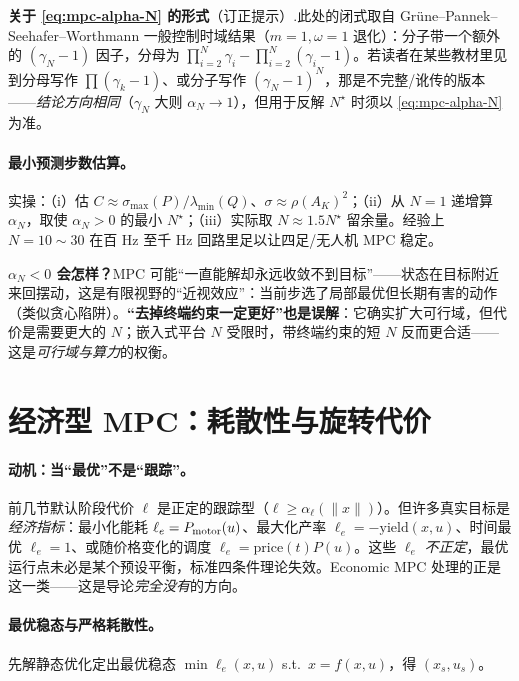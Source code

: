 \begin{note}
\textbf{关于 \cref{eq:mpc-alpha-N} 的形式}（订正提示）.\;此处的闭式取自 Grüne--Pannek--Seehafer--Worthmann 一般控制时域结果（$m=1,\omega=1$ 退化）：分子带一个额外的 $(\gamma_N-1)$ 因子，分母为 $\prod_{i=2}^N\gamma_i-\prod_{i=2}^N(\gamma_i-1)$。若读者在某些教材里见到分母写作 $\prod(\gamma_k-1)$、或分子写作 $(\gamma_N-1)^N$，那是不完整/讹传的版本——\emph{结论方向相同}（$\gamma_N$ 大则 $\alpha_N\to1$），但用于反解 $N^\star$ 时须以 \cref{eq:mpc-alpha-N} 为准。
\end{note}

\paragraph{最小预测步数估算。}
实操：（i）估 $C\approx\sigma_{\max}(P)/\lambda_{\min}(Q)$、$\sigma\approx\rho(A_K)^2$；（ii）从 $N=1$ 递增算 $\alpha_N$，取使 $\alpha_N>0$ 的最小 $N^\star$；（iii）实际取 $N\approx1.5N^\star$ 留余量。经验上 $N=10\sim30$ 在百 Hz 至千 Hz 回路里足以让四足/无人机 MPC 稳定。

\begin{remark}
\textbf{$\alpha_N<0$ 会怎样？}\;MPC 可能“一直能解却永远收敛不到目标”——状态在目标附近来回摆动，这是有限视野的“近视效应”：当前步选了局部最优但长期有害的动作（类似贪心陷阱）。\textbf{“去掉终端约束一定更好”也是误解}：它确实扩大可行域，但代价是需要更大的 $N$；嵌入式平台 $N$ 受限时，带终端约束的短 $N$ 反而更合适——这是\emph{可行域与算力}的权衡。
\end{remark}

\section{经济型 MPC：耗散性与旋转代价}
\label{sec:mpc-economic}

\paragraph{动机：当“最优”不是“跟踪”。}
前几节默认阶段代价 $\ell$ 是正定的跟踪型（$\ell\ge\alpha_\ell(\|x\|)$）。但许多真实目标是\emph{经济指标}：最小化能耗 $\ell_e=P_{\rm motor}(u)$、最大化产率 $\ell_e=-\mathrm{yield}(x,u)$、时间最优 $\ell_e=1$、或随价格变化的调度 $\ell_e=\mathrm{price}(t)P(u)$。这些 $\ell_e$ \emph{不正定}，最优运行点未必是某个预设平衡，标准四条件理论失效。Economic MPC 处理的正是这一类——这是导论\emph{完全没有}的方向。

\paragraph{最优稳态与严格耗散性。}
先解静态优化定出最优稳态 $\min\ell_e(x,u)$ s.t.\ $x=f(x,u)$，得 $(x_s,u_s)$。

